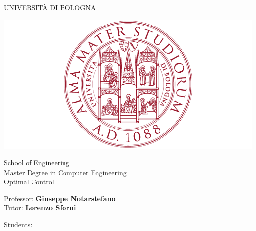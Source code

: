 \documentclass[a4paper,11pt,oneside]{book}
\begin{document}
\pagestyle{myheadings}

\thispagestyle{empty}                                                 
\begin{center}                                                            
    \vspace{5mm}
    {\LARGE UNIVERSIT\`A DI BOLOGNA} \\                       
      \vspace{5mm}
\end{center}
\begin{center}
  \includegraphics[scale=.27]{figs/logo_unibo}
\end{center}
\begin{center}
      \vspace{5mm}
      {\LARGE School of Engineering} \\
        \vspace{3mm}
      {\Large Master Degree in Computer Engineering} \\
      \vspace{20mm}
      {\LARGE Optimal Control} \\
      \vspace{15mm}
\end{center}
\begin{flushleft}                                                                              
     {\large Professor: \textbf{\@ Giuseppe Notarstefano}} \\  
     {\large Tutor: \textbf{\@ Lorenzo Sforni}} \\
      \vspace{13mm}
\end{flushleft}
\begin{flushright}
      {\large Students:} \\
       \\
       \\
       \\
\end{flushright}        %
\end{document}
